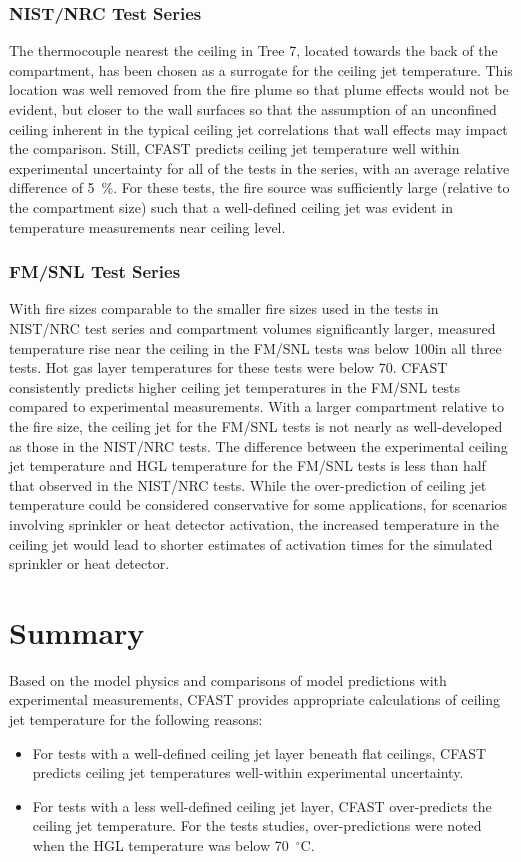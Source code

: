 \subsubsection{NIST/NRC Test Series}

The thermocouple nearest the ceiling in Tree 7, located towards the back of the compartment, has been chosen as a surrogate for the ceiling jet temperature. This location was well removed from the fire plume so that plume effects would not be evident, but closer to the wall surfaces so that the assumption of an unconfined ceiling inherent in the typical ceiling jet correlations that wall effects may impact the comparison. Still, CFAST predicts ceiling jet temperature well within experimental uncertainty for all of the tests in the series, with an average relative difference of 5~\%.  For these tests, the fire source was sufficiently large (relative to the compartment size) such that a well-defined ceiling jet was evident in temperature measurements near ceiling level.

\subsubsection{FM/SNL Test Series}

With fire sizes comparable to the smaller fire sizes used in the tests in NIST/NRC test series and compartment volumes significantly larger, measured temperature rise near the ceiling in the FM/SNL tests was below 100\degc in all three tests.  Hot gas layer temperatures for these tests were below 70\degc.  CFAST consistently predicts higher ceiling jet temperatures in the FM/SNL tests compared to experimental measurements.  With a larger compartment relative to the fire size, the ceiling jet for the FM/SNL tests is not nearly as well-developed as those in the NIST/NRC tests.  The difference between the experimental ceiling jet temperature and HGL temperature for the FM/SNL tests is less than half that observed in the NIST/NRC tests.  While the over-prediction of ceiling jet temperature could be considered conservative for some applications, for scenarios involving sprinkler or heat detector activation, the increased temperature in the ceiling jet would lead to shorter estimates of activation times for the simulated sprinkler or heat detector.

\section{Summary}

Based on the model physics and comparisons of model predictions with experimental measurements, CFAST provides appropriate calculations of ceiling jet temperature for the following reasons:
\begin{itemize}
\item For tests with a well-defined ceiling jet layer beneath flat ceilings, CFAST predicts ceiling jet temperatures well-within experimental uncertainty.
\item For tests with a less well-defined ceiling jet layer, CFAST over-predicts the ceiling jet temperature.  For the tests studies, over-predictions were noted when the HGL temperature was below 70~$^\circ$C.
\end{itemize}

